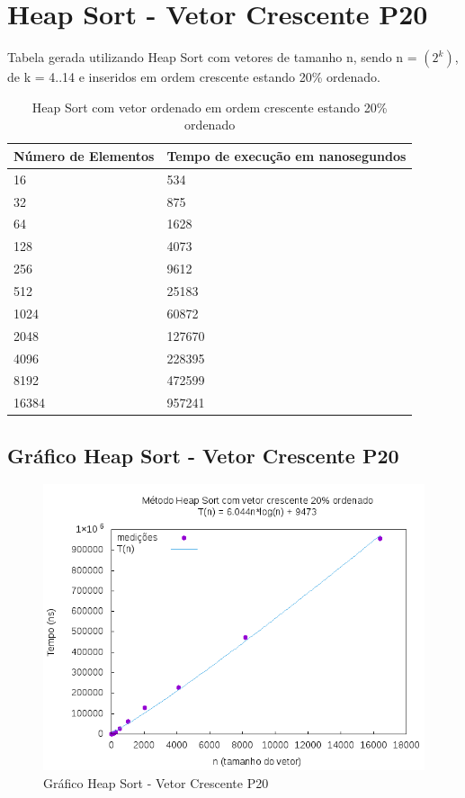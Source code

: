 \documentclass[12pt,a4paper,twoside]{report}
\begin{document}
\section{Heap Sort - Vetor Crescente P20}
Tabela gerada utilizando Heap Sort com vetores de tamanho n, sendo n = $(2^k)$, de k = 4..14 e inseridos em ordem crescente estando 20\% ordenado.
\begin{table}[H]
\centering
\caption{Heap Sort com vetor ordenado em ordem crescente estando 20\% ordenado}
\label{my-label}
\begin{tabular}{|l|l|}
\hline
\multicolumn{1}{|c|}{\textbf{Número de Elementos}} & \multicolumn{1}{c|}{\textbf{Tempo de execução em nanosegundos}} \\ \hline
16 & 534 \\ \hline
32 & 875 \\ \hline
64 & 1628 \\ \hline
128 & 4073 \\ \hline
256 & 9612 \\ \hline
512 & 25183 \\ \hline
1024 & 60872 \\ \hline
2048 & 127670 \\ \hline
4096 & 228395 \\ \hline
8192 & 472599 \\ \hline
16384 & 957241 \\ \hline
\end{tabular}
\end{table}

\subsection{Gráfico Heap Sort - Vetor Crescente P20}
\begin{figure}[H]
    \centering
    \includegraphics[width=0.7\linewidth]{graficos/HeapSort/vIntCrescenteP20/vIntCrescenteP20.png}
  \caption{Gráfico Heap Sort - Vetor Crescente P20}
\end{figure}
\end{document}
